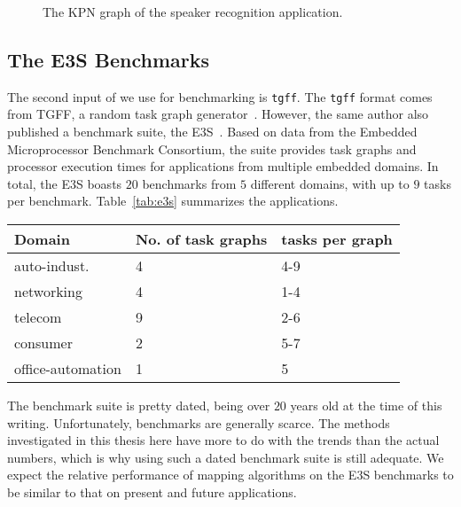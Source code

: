 \begin{figure}[h]
	\centering
\resizebox{0.9\textwidth}{!}{
     
 }
   \caption{The \ac{KPN} graph of the speaker recognition application.}
   \label{fig:speaker_recognition}
\end{figure}

\subsection{The E3S Benchmarks}

The second input of \mocasin we use for benchmarking is \texttt{tgff}.
The \texttt{tgff} format comes from \acf{TGFF}, a random task graph generator~\cite{dick1998tgff}. 
However, the same author also published a benchmark suite, the \ac{E3S}~\cite{e3s}.
Based on data from the Embedded Microprocessor Benchmark Consortium, the suite provides task graphs and processor execution times for applications from multiple embedded domains.
In total, the \ac{E3S} boasts $20$ benchmarks from $5$ different domains, with up to $9$ tasks per benchmark.
Table~\ref{tab:e3s} summarizes the applications.

\begin{table*}[t]
  \caption{Summary of applications in the \ac{E3S}}
  \begin{center}
    \begin{tabular}{lll}
      Domain & No. of task graphs & tasks per graph\\
      \hline
      auto-indust. & 4 & 4-9\\
      networking & 4 & 1-4\\
      telecom & 9 & 2-6\\
      consumer & 2 & 5-7\\
      office-automation & 1 & 5\\
    \end{tabular}
    \label{tab:e3s}
  \end{center}
  \vspace{-0.5cm}
\end{table*}

The benchmark suite is pretty dated, being over $20$ years old at the time of this writing.
Unfortunately, benchmarks are generally scarce.
The methods investigated in this thesis here have more to do with the trends than the actual numbers, which is why using such a dated benchmark suite is still adequate.
We expect the relative performance of mapping algorithms on the \ac{E3S} benchmarks to be similar to that on present and future applications.

